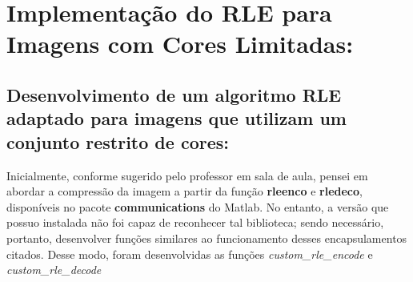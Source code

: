 \documentclass{article}
\begin{document}
\section{Implementação do RLE para Imagens com Cores Limitadas:}
\subsection{Desenvolvimento de um algoritmo RLE adaptado para imagens que utilizam um conjunto restrito de cores:}

Inicialmente, conforme sugerido pelo professor em sala de aula, pensei em abordar a compressão da imagem a partir da função \textbf{rleenco} e \textbf{rledeco}, disponíveis no pacote \textbf{communications} do Matlab. No entanto, a versão que possuo instalada não foi capaz de reconhecer tal biblioteca; sendo necessário, portanto, desenvolver funções similares ao funcionamento desses encapsulamentos citados. Desse modo, foram desenvolvidas as funções \textit{custom\_rle\_encode} e \textit{custom\_rle\_decode}
\end{document}
